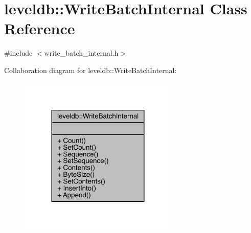 \hypertarget{classleveldb_1_1_write_batch_internal}{}\section{leveldb\+:\+:Write\+Batch\+Internal Class Reference}
\label{classleveldb_1_1_write_batch_internal}


{\ttfamily \#include $<$write\+\_\+batch\+\_\+internal.\+h$>$}



Collaboration diagram for leveldb\+:\+:Write\+Batch\+Internal\+:\nopagebreak
\begin{figure}[H]
\begin{center}
\leavevmode
\includegraphics[width=215pt]{classleveldb_1_1_write_batch_internal__coll__graph}
\end{center}
\end{figure}
